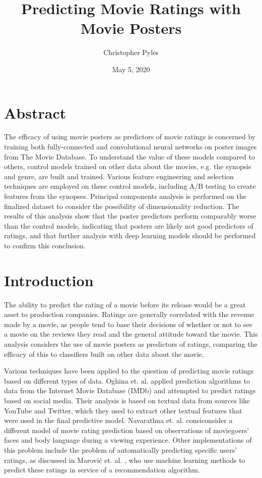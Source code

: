 \documentclass[12pt, oneside]{article}   	%
\title{%
	Predicting Movie Ratings with Movie Posters}
\author{Christopher Pyles}
\date{May 5, 2020}							%
\begin{document}
\maketitle

\section*{Abstract}

The efficacy of using movie posters as predictors of movie ratings is concerned by training both fully-connected and convolutional neural networks on poster images from The Movie Database. To understand the value of these models compared to others, control models trained on other data about the movies, e.g. the synopsis and genre, are built and trained. Various feature engineering and selection techniques are employed on these control models, including A/B testing to create features from the synopses. Principal components analysis is performed on the finalized dataset to consider the possibility of dimensionality reduction. The results of this analysis show that the poster predictors perform comparably worse than the control models, indicating that posters are likely not good predictors of ratings, and that further analysis with deep learning models should be performed to confirm this conclusion.

\newpage

\tableofcontents

\newpage

\section{Introduction}

The ability to predict the rating of a movie before its release would be a great asset to production companies. Ratings are generally correlated with the revenue made by a movie, as people tend to base their decisions of whether or not to see a movie on the reviews they read and the general attitude toward the movie. This analysis considers the use of movie posters as predictors of ratings, comparing the efficacy of this to classifiers built on other data about the movie.

Various techniques have been applied to the question of predicting movie ratings based on different types of data. Oghina et. al. \cite{oghina_predicting_2012} applied prediction algorithms to data from the Internet Movie Database (IMDb) and attempted to predict ratings based on social media. Their analysis is based on textual data from sources like YouTube and Twitter, which they used to extract other textual features that were used in the final predictive model. Navarathna et. al. \cite{navarathna_predicting_2014} consiconsider a different model of movie rating prediction based on observations of moviegoers' faces and body language during a viewing experience. Other implementations of this problem include the problem of automatically predicting specific users' ratings, as discussed in Marović et. al. \cite{marovic_automatic_2011}, who use machine learning methods to predict these ratings in service of a recommendation algorithm.
\end{document}
